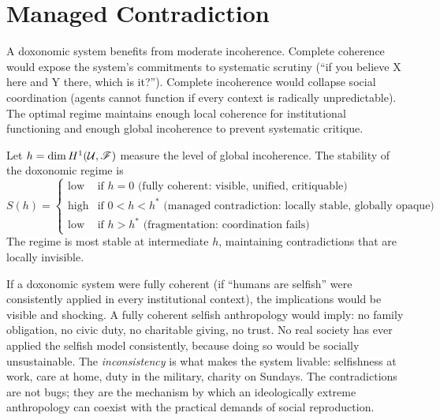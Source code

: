 \section{Managed Contradiction}
\label{sec:ch12-managed}

\begin{principle}
\label{prin:productive-incoherence}
A doxonomic system benefits from moderate incoherence.
Complete coherence would expose the system's commitments to systematic scrutiny (``if you believe X here and Y there, which is it?'').
Complete incoherence would collapse social coordination (agents cannot function if every context is radically unpredictable).
The optimal regime maintains enough local coherence for institutional functioning and enough global incoherence to prevent systematic critique.
\end{principle}

\begin{model}
\label{mod:optimal-incoherence}
Let $h = \dim H^1(\mathcal{U}, \mathscr{F})$ measure the level of global incoherence.
The stability of the doxonomic regime is
\[
  S(h) = \begin{cases}
    \text{low} & \text{if } h = 0 \text{ (fully coherent: visible, unified, critiquable)} \\
    \text{high} & \text{if } 0 < h < h^* \text{ (managed contradiction: locally stable, globally opaque)} \\
    \text{low} & \text{if } h > h^* \text{ (fragmentation: coordination fails)}
  \end{cases}
\]
The regime is most stable at intermediate $h$, maintaining contradictions that are locally invisible.
\end{model}

\begin{remark}
\label{rem:full-coherence-dangerous}
If a doxonomic system were fully coherent (if ``humans are selfish'' were consistently applied in every institutional context), the implications would be visible and shocking.
A fully coherent selfish anthropology would imply: no family obligation, no civic duty, no charitable giving, no trust.
No real society has ever applied the selfish model consistently, because doing so would be socially unsustainable.
The \emph{inconsistency} is what makes the system livable: selfishness at work, care at home, duty in the military, charity on Sundays.
The contradictions are not bugs; they are the mechanism by which an ideologically extreme anthropology can coexist with the practical demands of social reproduction.
\end{remark}

